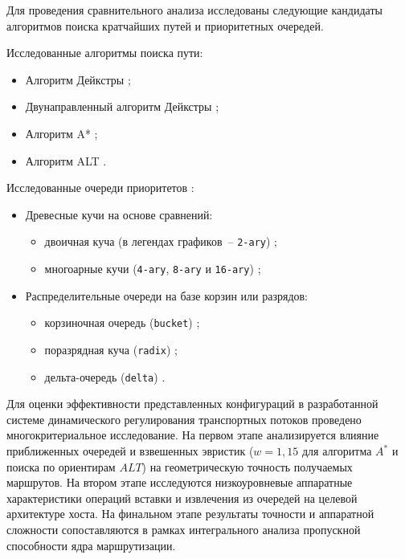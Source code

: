 Для проведения сравнительного анализа исследованы следующие кандидаты алгоритмов поиска кратчайших путей и приоритетных очередей.

Исследованные алгоритмы поиска пути:
\begin{itemize}
    \item Алгоритм Дейкстры \cite{cherkassky1994shortest};
    \item Двунаправленный алгоритм Дейкстры \cite{goldberg2005external};
    \item Алгоритм A* \cite{goldberg2004alt};
    \item Алгоритм ALT \cite{goldberg2004alt}.
\end{itemize}

Исследованные очереди приоритетов \cite{outerloop_heap}:
\begin{itemize}
    \item Древесные кучи на основе сравнений:
    \begin{itemize}
        \item двоичная куча (в легендах графиков~-- \texttt{2-ary}) \cite{biggar_sorting};
        \item многоарные кучи (\texttt{4-ary}, \texttt{8-ary} и \texttt{16-ary}) \cite{kusswurm2014modern};
    \end{itemize}
    \item Распределительные очереди на базе корзин или разрядов:
    \begin{itemize}
        \item корзиночная очередь (\texttt{bucket}) \cite{ahuja1990faster};
        \item поразрядная куча (\texttt{radix}) \cite{ahuja1990faster};
        \item дельта-очередь (\texttt{delta}) \cite{meyer2003delta}.
    \end{itemize}
\end{itemize}

Для оценки эффективности представленных конфигураций в разработанной системе динамического регулирования транспортных потоков проведено многокритериальное исследование. На первом этапе анализируется влияние приближенных очередей и взвешенных эвристик ($w = 1{,}15$ для алгоритма $A^*$ и поиска по ориентирам $ALT$) на геометрическую точность получаемых маршрутов. На втором этапе исследуются низкоуровневые аппаратные характеристики операций вставки и извлечения из очередей на целевой архитектуре хоста. На финальном этапе результаты точности и аппаратной сложности сопоставляются в рамках интегрального анализа пропускной способности ядра маршрутизации.


